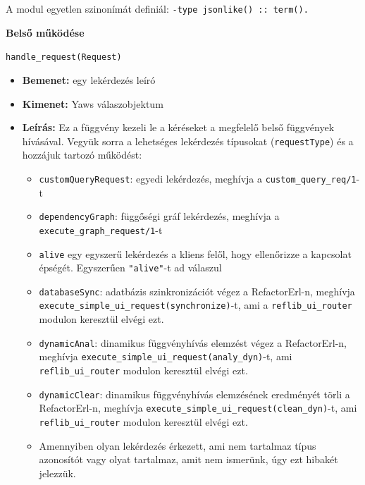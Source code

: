 \noindent A modul egyetlen szinonímát definiál:
\noindent \lstinline{-type jsonlike() :: term().}



\vspace{14pt}
\noindent \textbf{Belső működése}



\noindent \lstinline{handle_request(Request)}
\begin{itemize}
    \item \textbf{Bemenet:} egy lekérdezés leíró
    \item \textbf{Kimenet:} Yaws válaszobjektum
    \item \textbf{Leírás:} Ez a függvény kezeli le a kéréseket a megfelelő belső függvények hívásával. Vegyük sorra a lehetséges lekérdezés típusokat (\lstinline{requestType}) és a hozzájuk tartozó működést:
    \begin{itemize}
        \item \lstinline{customQueryRequest}: egyedi lekérdezés, meghívja a \lstinline{custom_query_req/1}-t
        
        \item \lstinline{dependencyGraph}: függőségi gráf lekérdezés, meghívja a \lstinline{execute_graph_request/1}-t
        
        \item \lstinline{alive}  egy egyszerű lekérdezés a kliens felől, hogy ellenőrizze a kapcsolat épségét. Egyszerűen \lstinline{"alive"}-t ad válaszul
        
        \item \lstinline{databaseSync}: adatbázis szinkronizációt végez a RefactorErl-n, meghívja \lstinline|execute_simple_ui_request(synchronize)|-t, ami a \lstinline{reflib_ui_router} modulon keresztül elvégi ezt.
        
        \item \lstinline{dynamicAnal}: dinamikus függvényhívás elemzést végez a RefactorErl-n, meghívja \lstinline|execute_simple_ui_request(analy_dyn)|-t, ami \lstinline{reflib_ui_router} modulon keresztül elvégi ezt.
        
        \item \lstinline{dynamicClear}: dinamikus függvényhívás elemzésének eredményét törli a RefactorErl-n, meghívja \lstinline|execute_simple_ui_request(clean_dyn)|-t, ami \lstinline{reflib_ui_router} modulon keresztül elvégi ezt.
        
        \item Amennyiben olyan lekérdezés érkezett, ami nem tartalmaz típus azonosítót vagy olyat tartalmaz, amit nem ismerünk, úgy ezt hibakét jelezzük.
        
    \end{itemize}
\end{itemize} 



